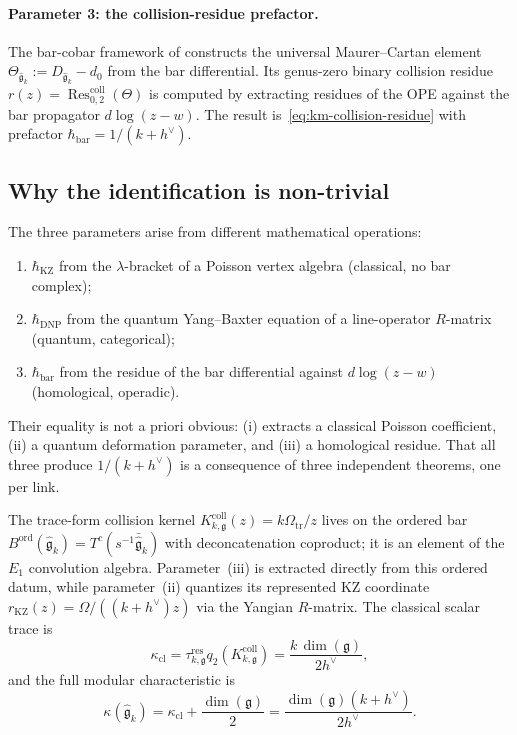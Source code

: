 \documentclass[11pt]{article}
\theoremstyle{plain}
\theoremstyle{definition}
\theoremstyle{remark}
\newcommand{\fg}{\mathfrak{g}}
\newcommand{\Res}{\operatorname{Res}}
\numberwithin{equation}{section}
\begin{document}
\paragraph{Parameter 3: the collision-residue prefactor.}
The bar-cobar framework of \cite{Lorgat2026a} constructs the
universal Maurer--Cartan element
$\Theta_{\widehat{\fg}_k} := D_{\widehat{\fg}_k} - d_0$ from the bar
differential. Its genus-zero binary collision residue
$r(z) = \Res^{\mathrm{coll}}_{0,2}(\Theta)$ is computed by
extracting residues of the OPE against the bar propagator
$d\log(z-w)$. The result is~\eqref{eq:km-collision-residue} with
prefactor $\hbar_{\mathrm{bar}} = 1/(k + h^\vee)$.

\subsection{Why the identification is non-trivial}

The three parameters arise from different mathematical operations:
\begin{enumerate}[label=(\roman*)]
 \item $\hbar_{\mathrm{KZ}}$ from the $\lambda$-bracket of a Poisson
 vertex algebra (classical, no bar complex);
 \item $\hbar_{\mathrm{DNP}}$ from the quantum Yang--Baxter equation
 of a line-operator $R$-matrix (quantum, categorical);
 \item $\hbar_{\mathrm{bar}}$ from the residue of the bar
 differential against $d\log(z-w)$ (homological, operadic).
\end{enumerate}
Their equality is not a priori obvious: (i) extracts a classical
Poisson coefficient, (ii) a quantum deformation parameter, and (iii)
a homological residue. That all three produce $1/(k + h^\vee)$ is a
consequence of three independent theorems, one per link.

The trace-form collision kernel
$K_{k,\fg}^{\mathrm{coll}}(z)=k\Omega_{\mathrm{tr}}/z$ lives on the
ordered bar $B^{\mathrm{ord}}(\widehat{\fg}_k) =
T^c(s^{-1}\bar{\widehat{\fg}}_k)$ with deconcatenation coproduct;
it is an element of the $E_1$ convolution algebra. Parameter~(iii)
is extracted directly from this ordered datum, while parameter~(ii)
quantizes its represented KZ coordinate
$r_{\mathrm{KZ}}(z)=\Omega/((k+h^\vee)z)$ via the Yangian $R$-matrix.
The classical scalar trace is
\[
\kappa_{\mathrm{cl}}
=\tau_{k,\fg}^{\mathrm{res}}q_2(K_{k,\fg}^{\mathrm{coll}})
= \frac{k\,\dim(\fg)}{2h^\vee},
\]
and the full modular characteristic is
\[
\kappa(\widehat{\fg}_k)
= \kappa_{\mathrm{cl}} + \frac{\dim(\fg)}{2}
= \frac{\dim(\fg)(k+h^\vee)}{2h^\vee}.
\]
\end{document}
